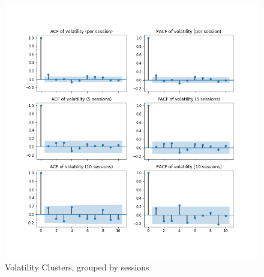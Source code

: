 
\setcounter{figure}{0}
\begin{appendices}
    
    \begin{figure}
        \includegraphics[width=\linewidth]{plots/basic_volaclusters_per_session.png}
        \caption{Volatility Clusters, grouped by sessions}
        \label{app:basic_volaclusters_per_session}
    \end{figure}

\end{appendices}